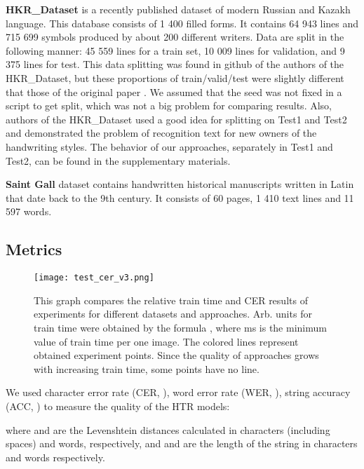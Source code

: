 \documentclass[10pt,twocolumn,letterpaper]{article}
\begin{document}
\medskip
\noindent 
\textbf{HKR\_Dataset} \cite{nurseitov2020hkr} is a recently published dataset of modern Russian and Kazakh language. This database consists of  1 400 filled forms. It contains 64 943 lines and  715 699 symbols produced by about 200 different writers. Data are split in the following manner: 45 559 lines for a train set, 10 009 lines for validation, and 9 375 lines for test. This data splitting was found in github \cite{hkr_splitting_github} of the authors of the HKR\_Dataset, but these proportions of train/valid/test were slightly different that those of the original paper \cite{nurseitov2020hkr}. We assumed that the seed was not fixed in a script to get split, which was not a big problem for comparing results. Also, authors of the HKR\_Dataset used a good idea for splitting on Test1 and Test2 and demonstrated the problem of recognition text for new owners of the handwriting styles. The behavior of our approaches, separately in Test1 and Test2, can be found in the supplementary  materials.




\medskip
\noindent 
\textbf{Saint Gall} dataset contains handwritten historical manuscripts written in Latin that date back to the 9th century. It consists of 60 pages, 1 410 text lines and 11 597 words.

\subsection{Metrics}

\begin{figure*}
\begin{center}
\texttt{[image: test\_cer\_v3.png]}
\end{center}
   \caption{This graph compares the relative train time and CER results of experiments for different datasets and approaches. Arb. units for train time were obtained by the formula , where  ms is the minimum value of train time per one image. The colored lines represent obtained experiment points. Since the quality of approaches grows with increasing train time, some points have no line.}
\label{fig:test_cer}
\end{figure*}

We used character error rate (CER, ), word error rate (WER, ), string accuracy (ACC, ) to measure the quality of the HTR models:



where  and  are the Levenshtein distances calculated in characters (including spaces) and words, respectively, and  and  are the length of the string in characters and words respectively.
\end{document}
